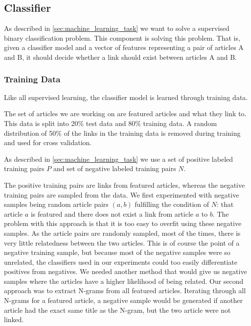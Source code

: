 \subsection{Classifier}
As described in \cref{sec:machine_learning_task} we want to solve a supervised binary classification problem. This component is solving this problem. That is, given a classifier model and a vector of features representing a pair of articles A and B, it should decide whether a link should exist between articles A and B.

\subsubsection{Training Data}
Like all supervised learning, the classifier model is learned through training data.

The set of articles we are working on are featured articles and what they link to. This data is split into 20\% test data and 80\% training data. A random distribution of 50\% of the links in the training data is removed during training and used for cross validation.


As described in \cref{sec:machine_learning_task} we use a set of positive labeled training pairs $P$ and set of negative labeled training pairs $N$.


The positive training pairs are links from featured articles, whereas the negative training pairs are sampled from the data.
We first experimented with negative samples being random article pairs $(a,b)$ fulfilling the condition of $N$: that article $a$ is featured and there does not exist a link from article $a$ to $b$. The problem with this approach is that it is too easy to overfit using these negative samples. As the article pairs are randomly sampled, most of the times, there is very little relatedness between the two articles. This is of course the point of a negative training sample, but because most of the negative samples were so unrelated, the classifiers used in our experiments could too easily differentiate positives from negatives. We needed another method that would give us negative samples where the articles have a higher likelihood of being related. Our second approach was to extract N-grams from all featured articles. Iterating through all N-grams for a featured article, a negative sample would be generated if another article had the exact same title as the N-gram, but the two article were not linked.

